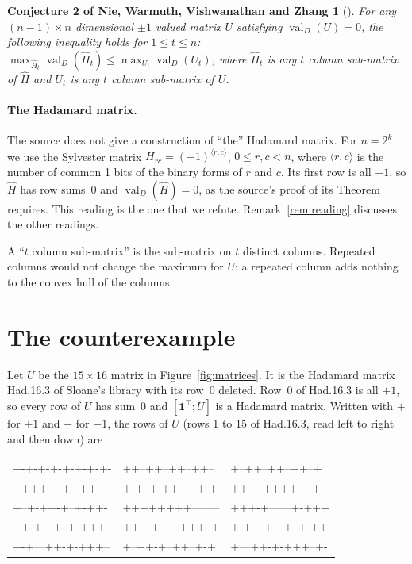 \documentclass[11pt]{article}
\newtheorem*{sourceconj}{Conjecture 2 of Nie, Warmuth, Vishwanathan and Zhang}
\theoremstyle{remark}
\newcommand{\valD}{\operatorname{val}_D}
\newcommand{\Hh}{\hat H}
\begin{document}
\begin{sourceconj}[{\cite[p.~3]{nie2013}}]
For any $(n-1)\times n$ dimensional $\pm1$ valued matrix $U$ satisfying $\valD(U)=0$, the
following inequality holds for $1\le t\le n$:
$\max_{\Hh_t}\valD(\Hh_t)\le\max_{U_t}\valD(U_t)$, where $\Hh_t$ is any $t$ column
sub-matrix of $\Hh$ and $U_t$ is any $t$ column sub-matrix of $U$.
\end{sourceconj}

\paragraph{The Hadamard matrix.} The source does not give a construction of ``the''
Hadamard matrix. For $n=2^k$ we use the Sylvester matrix
$H_{rc}=(-1)^{\langle r,c\rangle}$, $0\le r,c<n$, where $\langle r,c\rangle$ is the number
of common 1 bits of the binary forms of $r$ and $c$. Its first row is all $+1$, so $\Hh$
has row sums~0 and $\valD(\Hh)=0$, as the source's proof of its Theorem requires. This
reading is the one that we refute. Remark~\ref{rem:reading} discusses the other readings.

A ``$t$ column sub-matrix'' is the sub-matrix on $t$ distinct columns. Repeated columns
would not change the maximum for $U$: a repeated column adds nothing to the convex hull of
the columns.

\section{The counterexample}

Let $U$ be the $15\times16$ matrix in Figure~\ref{fig:matrices}. It is the Hadamard matrix
Had.16.3 of Sloane's library \cite{sloane} with its row~0 deleted. Row~0 of Had.16.3 is all
$+1$, so every row of $U$ has sum~0 and $[\mathbf 1^\top; U]$ is a Hadamard matrix. Written
with $+$ for $+1$ and $-$ for $-1$, the rows of $U$ (rows 1 to 15 of Had.16.3, read left to
right and then down) are
\begin{center}\small\ttfamily
\begin{tabular}{lll}
+-+-+-+-+-+-+-+- & ++--++--++--++-- & +--++--++--++--+\\
++++----++++---- & +-+--+-++-+--+-+ & ++----++++----++\\
+--+-++-+--+-++- & ++++++++-------- & +++-+------+-+++\\
++-+---+--+-+++- & ++---++---+++--+ & +-++-+---+--+-++\\
+-+---++-+-+++-- & +--++-+--++--+-+ & +---++-+-+++--+-
\end{tabular}
\end{center}
\end{document}
